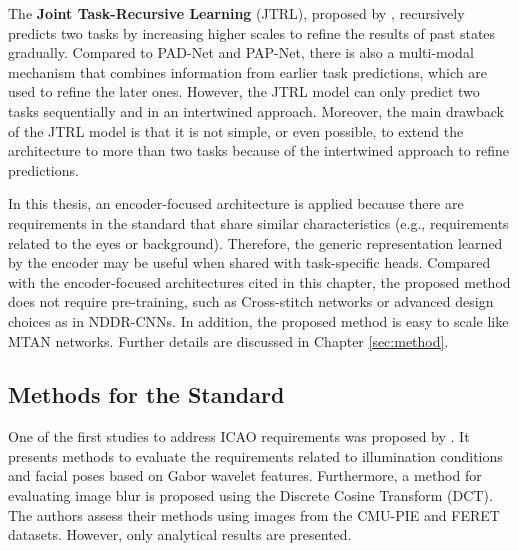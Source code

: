 The \textbf{Joint Task-Recursive Learning} (JTRL), proposed by \cite{zhang2018joint}, recursively predicts two tasks by increasing higher scales to refine the results of past states gradually. Compared to PAD-Net and PAP-Net, there is also a multi-modal mechanism that combines information from earlier task predictions, which are used to refine the later ones. However, the JTRL model can only predict two tasks sequentially and in an intertwined approach. Moreover, the main drawback of the JTRL model is that it is not simple, or even possible, to extend the architecture to more than two tasks because of the intertwined approach to refine predictions.
 
In this thesis, an encoder-focused architecture is applied because there are requirements in the \icao standard that share similar characteristics (e.g., requirements related to the eyes or background). Therefore, the generic representation learned by the encoder may be useful when shared with task-specific heads. Compared with the encoder-focused architectures cited in this chapter, the proposed method does not require pre-training, such as Cross-stitch networks or advanced design choices as in NDDR-CNNs. In addition, the proposed method is easy to scale like MTAN networks. Further details are discussed in Chapter \ref{sec:method}.
 
\subsection{Methods for the \icao Standard}
 
One of the first studies to address ICAO requirements was proposed by \citet{sang2009face}. It presents methods to evaluate the requirements related to illumination conditions and facial poses based on Gabor wavelet features. Furthermore, a method for evaluating image blur is proposed using the Discrete Cosine Transform (DCT). The authors assess their methods using images from the CMU-PIE \citep{sim2002cmu} and FERET \citep{phillips1998feret} datasets. However, only analytical results are presented.
 
